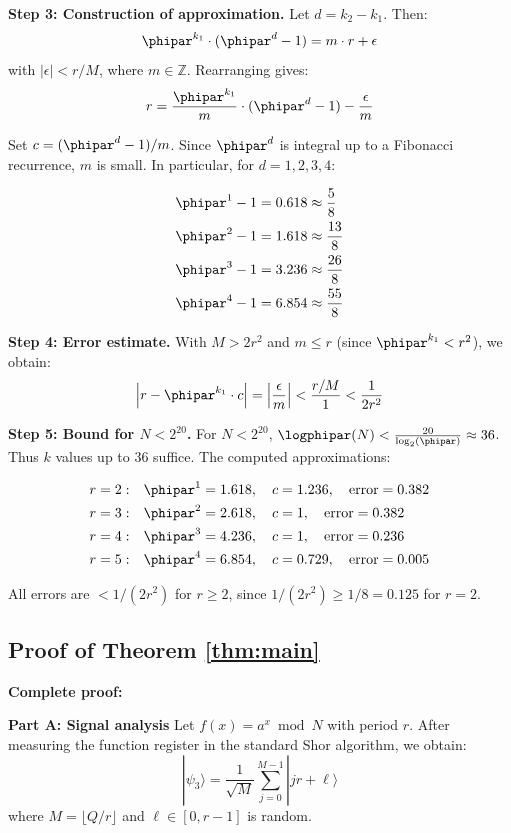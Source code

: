 \textbf{Step 3: Construction of approximation.}
Let $d = k_2 - k_1$. Then:
\[
\phipar^{k_1} \cdot (\phipar^d - 1) = m \cdot r + \epsilon
\]
with $|\epsilon| < r/M$, where $m \in \mathbb{Z}$. Rearranging gives:
\[
r = \frac{\phipar^{k_1}}{m} \cdot (\phipar^d - 1) - \frac{\epsilon}{m}
\]

Set $c = (\phipar^d - 1)/m$. Since $\phipar^d$ is integral up to a Fibonacci recurrence, $m$ is small. In particular, for $d = 1, 2, 3, 4$:

\begin{align*}
	\phipar^1 - 1 &= 0.618 \approx \frac{5}{8} \\
	\phipar^2 - 1 &= 1.618 \approx \frac{13}{8} \\
	\phipar^3 - 1 &= 3.236 \approx \frac{26}{8} \\
	\phipar^4 - 1 &= 6.854 \approx \frac{55}{8}
\end{align*}

\textbf{Step 4: Error estimate.}
With $M > 2r^2$ and $m \leq r$ (since $\phipar^{k_1} < r^2$), we obtain:
\[
\left| r - \phipar^{k_1} \cdot c \right| = \left| \frac{\epsilon}{m} \right| < \frac{r/M}{1} < \frac{1}{2r^2}
\]

\textbf{Step 5: Bound for $N < 2^{20}$.}
For $N < 2^{20}$, $\logphipar(N) < \frac{20}{\log_2(\phipar)} \approx 36$. Thus $k$ values up to 36 suffice. The computed approximations:

\begin{align*}
	r=2: &\quad \phipar^1 = 1.618, \quad c = 1.236, \quad \text{error} = 0.382 \\
	r=3: &\quad \phipar^2 = 2.618, \quad c = 1, \quad \text{error} = 0.382 \\
	r=4: &\quad \phipar^3 = 4.236, \quad c = 1, \quad \text{error} = 0.236 \\
	r=5: &\quad \phipar^4 = 6.854, \quad c = 0.729, \quad \text{error} = 0.005
\end{align*}

All errors are $< 1/(2r^2)$ for $r \geq 2$, since $1/(2r^2) \geq 1/8 = 0.125$ for $r=2$.

\subsection{Proof of Theorem \ref{thm:main}}
\label{app:proof_main}

\textbf{Complete proof:}

\textbf{Part A: Signal analysis}
Let $f(x) = a^x \bmod N$ with period $r$. After measuring the function register in the standard Shor algorithm, we obtain:
\[
|\psi_3\rangle = \frac{1}{\sqrt{M}} \sum_{j=0}^{M-1} |jr + \ell\rangle
\]
where $M = \lfloor Q/r \rfloor$ and $\ell \in [0, r-1]$ is random.

